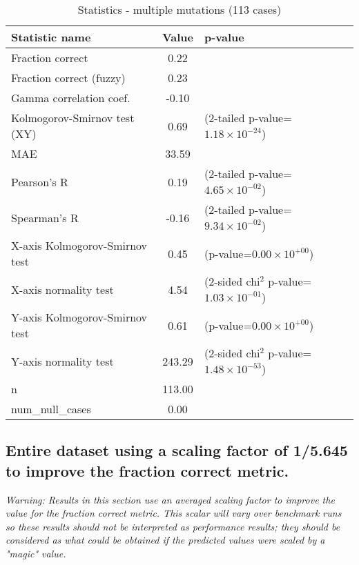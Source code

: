 \documentclass[10pt, letterpaper, oneside, titlepage, landscape]{scrreprt}
\begin{document}
\begin{table}[H]\begin{center}
\begin{tabular}{ l S[table-format=3.2] l}
Statistic name & {Value} & p-value\\
\hline
Fraction correct & 0.22 & \\
Fraction correct (fuzzy) & 0.23 & \\
Gamma correlation coef. & -0.10 & \\
Kolmogorov-Smirnov test (XY) & 0.69 & (2-tailed p-value=$1.18\times10^{-24}$)\\
MAE & 33.59 & \\
Pearson's R & 0.19 & (2-tailed p-value=$4.65\times10^{-02}$)\\
Spearman's R & -0.16 & (2-tailed p-value=$9.34\times10^{-02}$)\\
X-axis Kolmogorov-Smirnov test & 0.45 & (p-value=$0.00\times10^{+00}$)\\
X-axis normality test & 4.54 & (2-sided chi$^{2}$ p-value=$1.03\times10^{-01}$)\\
Y-axis Kolmogorov-Smirnov test & 0.61 & (p-value=$0.00\times10^{+00}$)\\
Y-axis normality test & 243.29 & (2-sided chi$^{2}$ p-value=$1.48\times10^{-53}$)\\
n & 113.00 & \\
num\_null\_cases & 0.00 & \\
\end{tabular}
\caption{Statistics - multiple mutations (113 cases)}
\end{center}\end{table}


\subsection{Entire dataset using a scaling factor of 1/5.645 to improve the fraction correct metric.}
\textit{Warning: Results in this section use an averaged scaling factor to improve the value for the fraction correct metric. This scalar will vary over benchmark runs so these results should not be interpreted as performance results; they should be considered as what could be obtained if the predicted values were scaled by a "magic" value.}
\end{document}
